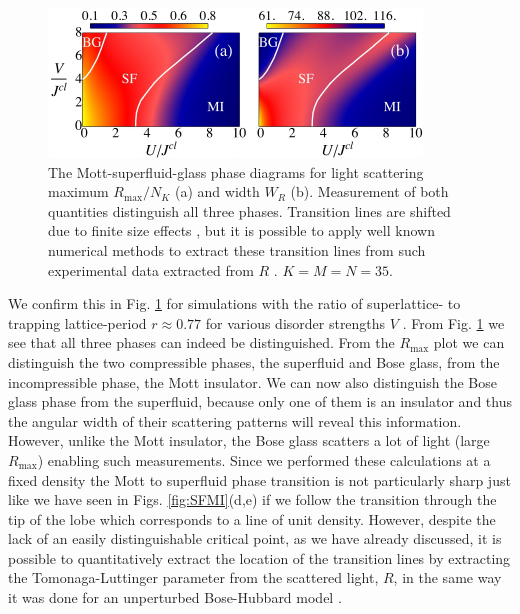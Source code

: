 \begin{figure}[htbp!]  
  \centering
  \includegraphics[width=\linewidth]{oph22}
  \caption[Mapping the Disoredered Phase Diagram]{The
    Mott-superfluid-glass phase diagrams for light scattering maximum
    $R_\text{max}/N_K$ (a) and width $W_R$ (b). Measurement of both
    quantities distinguish all three phases. Transition lines are
    shifted due to finite size effects \cite{roux2008}, but it is
    possible to apply well known numerical methods to extract these
    transition lines from such experimental data extracted from $R$
    \cite{ejima2011}. $K=M=N=35$.}
  \label{fig:BG}
\end{figure}

We confirm this in Fig. \ref{fig:BG} for simulations with the ratio of
superlattice- to trapping lattice-period $r\approx 0.77$ for various
disorder strengths $V$ \cite{roux2008}. From Fig. \ref{fig:BG} we see
that all three phases can indeed be distinguished. From the
$R_\mathrm{max}$ plot we can distinguish the two compressible phases,
the superfluid and Bose glass, from the incompressible phase, the Mott
insulator. We can now also distinguish the Bose glass phase from the
superfluid, because only one of them is an insulator and thus the
angular width of their scattering patterns will reveal this
information. However, unlike the Mott insulator, the Bose glass
scatters a lot of light (large $R_\mathrm{max}$) enabling such
measurements. Since we performed these calculations at a fixed density
the Mott to superfluid phase transition is not particularly sharp
\cite{cazalilla2011, ejima2011, kuhner2000, pino2012, pino2013} just
like we have seen in Figs. \ref{fig:SFMI}(d,e) if we follow the
transition through the tip of the lobe which corresponds to a line of
unit density. However, despite the lack of an easily distinguishable
critical point, as we have already discussed, it is possible to
quantitatively extract the location of the transition lines by
extracting the Tomonaga-Luttinger parameter from the scattered light,
$R$, in the same way it was done for an unperturbed Bose-Hubbard model
\cite{ejima2011}.

